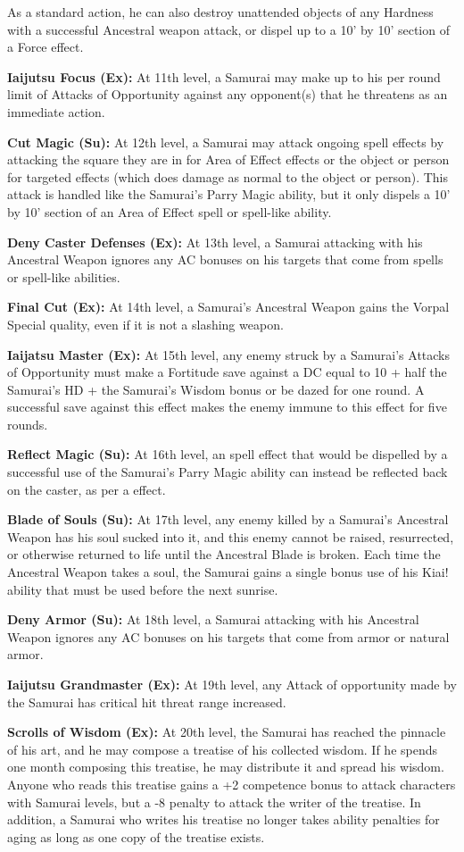 As a standard action, he can also destroy unattended objects of any Hardness with a successful Ancestral weapon attack, or dispel up to a 10' by 10' section of a Force effect.

\textbf{Iaijutsu Focus (Ex):} At 11th level, a Samurai may make up to his per round limit of Attacks of Opportunity against any opponent(s) that he threatens as an immediate action. 

\textbf{Cut Magic (Su):} At 12th level, a Samurai may attack ongoing spell effects by attacking the square they are in for Area of Effect effects or the object or person for targeted effects (which does damage as normal to the object or person). This attack is handled like the Samurai's Parry Magic ability, but it only dispels a 10' by 10' section of an Area of Effect spell or spell-like ability.

\textbf{Deny Caster Defenses (Ex):} At 13th level, a Samurai attacking with his Ancestral Weapon ignores any AC bonuses on his targets that come from spells or spell-like abilities.

\textbf{Final Cut (Ex):} At 14th level, a Samurai's Ancestral Weapon gains the Vorpal Special quality, even if it is not a slashing weapon. 

\textbf{Iaijatsu Master (Ex):} At 15th level, any enemy struck by a Samurai's Attacks of Opportunity must make a Fortitude save against a DC equal to 10 + half the Samurai's HD + the Samurai's Wisdom bonus or be dazed for one round. A successful save against this effect makes the enemy immune to this effect for five rounds. 

\textbf{Reflect Magic (Su):} At 16th level, an spell effect that would be dispelled by a successful use of the Samurai's Parry Magic ability can instead be reflected back on the caster, as per a  effect. 

\textbf{Blade of Souls (Su):} At 17th level, any enemy killed by a Samurai's Ancestral Weapon has his soul sucked into it, and this enemy cannot be raised, resurrected, or otherwise returned to life until the Ancestral Blade is broken. Each time the Ancestral Weapon takes a soul, the Samurai gains a single bonus use of his Kiai! ability that must be used before the next sunrise.

\textbf{Deny Armor (Su):} At 18th level, a Samurai attacking with his Ancestral Weapon ignores any AC bonuses on his targets that come from armor or natural armor.

\textbf{Iaijutsu Grandmaster (Ex):} At 19th level, any Attack of opportunity made by the Samurai has critical hit threat range increased.

\textbf{Scrolls of Wisdom (Ex):} At 20th level, the Samurai has reached the pinnacle of his art, and he may compose a treatise of his collected wisdom. If he spends one month composing this treatise, he may distribute it and spread his wisdom. Anyone who reads this treatise gains a +2 competence bonus to attack characters with Samurai levels, but a -8 penalty to attack the writer of the treatise. In addition, a Samurai who writes his treatise no longer takes ability penalties for aging as long as one copy of the treatise exists. 
